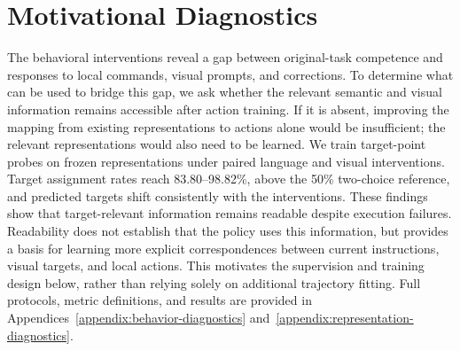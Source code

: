 \hypertarget{motivating-diagnostics-why-vlas-struggle-with-diverse-instructions-and-reliable-control}{%
\section{Motivational Diagnostics}\label{motivating-diagnostics-why-vlas-struggle-with-diverse-instructions-and-reliable-control}}

The behavioral interventions reveal a gap between original-task competence and responses to local
commands, visual prompts, and corrections. To determine what can be used to bridge this gap, we ask
whether the relevant semantic and visual information remains accessible after action training. If it
is absent, improving the mapping from existing representations to actions alone would be
insufficient; the relevant representations would also need to be learned. We train target-point
probes on frozen representations under paired language and visual interventions. Target assignment
rates reach 83.80--98.82\%, above the 50\% two-choice reference, and predicted targets shift
consistently with the interventions. These findings show that target-relevant information remains
readable despite execution failures. Readability does not establish that the policy uses this
information, but provides a basis for learning more explicit correspondences between current
instructions, visual targets, and local actions. This motivates the supervision and training design
below, rather than relying solely on additional trajectory fitting. Full protocols, metric
definitions, and results are provided in Appendices~\ref{appendix:behavior-diagnostics}
and~\ref{appendix:representation-diagnostics}.

